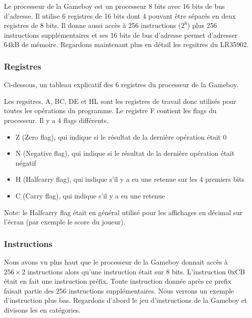 \documentclass[a4paper]{article}
\begin{document}
Le processeur de la Gameboy est un processeur 8 bits avec 16 bits de bus d'adresse.
Il utilise 6 registres de 16 bits dont 4 pouvant être séparés en deux registres de
8 bits. Il donne aussi accès à 256 instructions ($2^{8}$) plus 256 instructions
supplémentaires et ses 16 bits de bus d'adresse permet d'adresser 64kB de mémoire.
Regardons maintenant plus en détail les regsitres du LR35902.

\subsubsection{Registres}
Ci-dessous, un tableau explicatif des 6 registres du processeur de la Gameboy.
\begin{center}
\end{center}
Les regsitres, A, BC, DE et HL sont les registres de travail donc utilisés pour
toutes les opérations du programme. Le registre F contient les flags du processeur.
Il y a 4 flags différents.
\begin{itemize}[label=\textbullet]
	\item Z (Zero flag), qui indique si le résultat de la dernière opération était 0
	\item N (Negative flag), qui indique si le résultat de la dernière opération était négatif
	\item H (Halfcarry flag), qui indique s'il y a eu une retenue sur les 4 premiers bits
	\item C (Carry flag), qui indique s'il y a eu une retenue
\end{itemize}
Note: le Halfcarry flag était en général utilisé pour les affichages en décimal sur
l'écran (par exemple le score du joueur).

\subsubsection{Instructions}
Nous avons vu plus haut que le processeur de la Gameboy donnait accès à $256 \times 2$
instructions alors qu'une instruction était sur 8 bits. L'instruction 0xCB était
en fait une instruction préfix. Toute instruction donnée après ce prefix faisait
partie des 256 instructions supplémentaires. Nous verrons un exemple d'instruction
plus bas. Regardons d'abord le jeu d'instructions de la Gameboy et divisons les en catégories.
\end{document}
